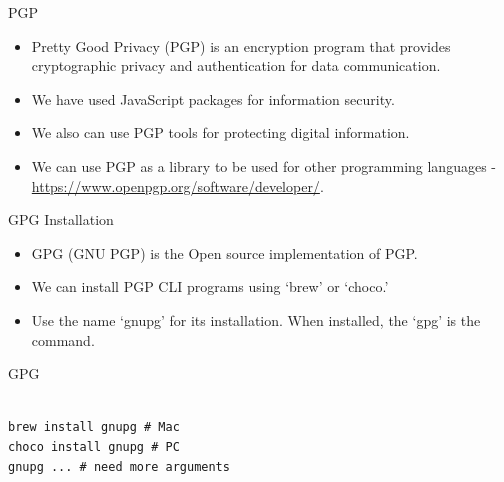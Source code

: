 \begin{frame}[fragile]{PGP}
\begin{itemize}
	\item Pretty Good Privacy (PGP) is an encryption program that provides cryptographic privacy and authentication for data communication.
	\item We have used JavaScript packages for information security.
	\item We also can use PGP tools for protecting digital information.
	\item We can use PGP as a library to be used for other programming languages - \href{https://www.openpgp.org/software/developer/}{https://www.openpgp.org/software/developer/}. 
\end{itemize}
\end{frame}

\begin{frame}[fragile]{GPG Installation}

\begin{itemize}
	\item GPG (GNU PGP) is the Open source implementation of PGP. 
	\item We can install PGP CLI programs using `brew' or `choco.'
	\item Use the name `gnupg' for its installation. When installed, the `gpg' is the command.
\end{itemize}

\begin{Command}{GPG}
\begin{lstlisting}[firstnumber=1, label=glabels, xleftmargin=0pt, basicstyle=\scriptsize]% 

brew install gnupg # Mac
choco install gnupg # PC
gnupg ... # need more arguments
\end{lstlisting}%
\end{Command}

\end{frame}

